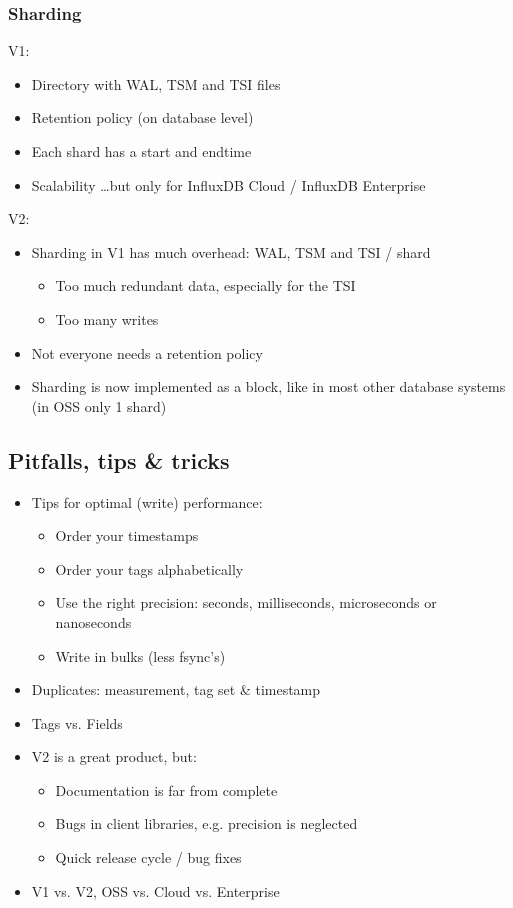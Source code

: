 \documentclass{article}
\begin{document}
\subsubsection{Sharding}

V1:

\begin{itemize}
    \item Directory with WAL, TSM and TSI files
    \item Retention policy (on database level)
    \item Each shard has a start and endtime
    \item Scalability \dots but only for InfluxDB Cloud / InfluxDB Enterprise
\end{itemize}

V2:

\begin{itemize}
    \item Sharding in V1 has much overhead: WAL, TSM and TSI / shard 
    \begin{itemize}
        \item Too much redundant data, especially for the TSI
        \item Too many writes
    \end{itemize}
    \item Not everyone needs a retention policy
    \item Sharding is now implemented as a block, like in most other database systems (in OSS only 1 shard)
\end{itemize}

\subsection{Pitfalls, tips \& tricks}

\begin{itemize}
    \item Tips for optimal (write) performance:
    \begin{itemize}
        \item Order your timestamps
        \item Order your tags alphabetically
        \item Use the right precision: seconds, milliseconds, microseconds or nanoseconds
        \item Write in bulks (less fsync's)
    \end{itemize}
    \item Duplicates: measurement, tag set \& timestamp
    \item Tags vs. Fields 
    \item V2 is a great product, but:
    \begin{itemize}
        \item Documentation is far from complete
        \item Bugs in client libraries, e.g. precision is neglected
        \item Quick release cycle / bug fixes
    \end{itemize}
    \item V1 vs. V2, OSS vs. Cloud vs. Enterprise
\end{itemize}
\end{document}
